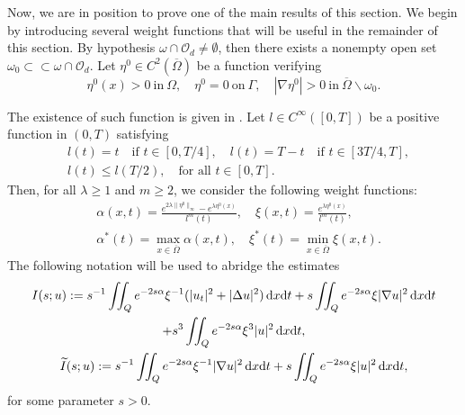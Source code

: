 \documentclass{dcds-bOF}
\theoremstyle{definition}
\def\dx{\,\textnormal{d}x}
\def\dt{\textnormal{d}t}
\begin{document}
Now, we are in position to prove one of the main results of this section. We begin by introducing several weight functions that will be useful in the remainder of this section. By hypothesis $\omega\cap\mathcal O_d\neq \emptyset$, then there exists a nonempty open set $\omega_0\subset\subset\omega\cap\mathcal O_d$. Let $\eta^0\in C^2(\overline\Omega)$ be a function verifying
%
\begin{equation}\label{constr_1}
\eta^0(x)>0 \ \text{in} \ \Omega, \quad \eta^0=0 \ \text{on} \ \Gamma, \quad |\nabla\eta^0|>0 \ \text{in} \ \overline{\Omega}\backslash\omega_0.
\end{equation}
%

The existence of such function is given in \cite{fursi}. Let $l\in C^\infty([0,T])$ be a positive function in $(0,T)$ satisfying
%
\begin{equation*}
\begin{split}
&l(t)=t \quad \text{if } t\in [0,T/4], \quad l(t)=T-t \quad \text{if } t\in [3T/4,T], \\
&l(t)\leq l(T/2), \quad \text{for all } t\in[0,T].
\end{split}
\end{equation*}
%
Then, for all $\lambda\geq 1$ and $m\geq 2$, we consider the following weight functions:
%
\begin{equation}\label{weights_l}
\begin{split}
&\alpha(x,t)= \frac{e^{2\lambda\|\eta^0\|_\infty}-e^{\lambda\eta^0(x)}}{l^m(t)}, \quad \xi(x,t)=\frac{e^{\lambda \eta^0(x)}}{l^m(t)}, \\
&\alpha^*(t)=\max_{x\in\overline{\Omega}}\alpha(x,t), \quad \xi^*(t)=\min_{x\in\overline\Omega} \xi(x,t).
\end{split}
\end{equation}
%
The following notation will be used to abridge the estimates
%
\begin{equation*}
\begin{gathered}
I(s;u):=s^{-1}\iint_{Q}e^{-2s\alpha}\xi^{-1}(|u_t|^2+|\Delta u|^2)\dx\dt+s\iint_Qe^{-2s\alpha}\xi|\nabla u|^2\dx\dt\\+s^3\iint_Qe^{-2s\alpha}\xi^3|u|^2\dx\dt, \\
\widetilde I(s;u):=s^{-1}\iint_{Q}e^{-2s\alpha}\xi^{-1}|\nabla u|^2\dx\dt+s\iint_{Q}e^{-2s\alpha}\xi |u|^2\dx\dt,
\end{gathered}
\end{equation*}
%
for some parameter $s>0$.
\end{document}

